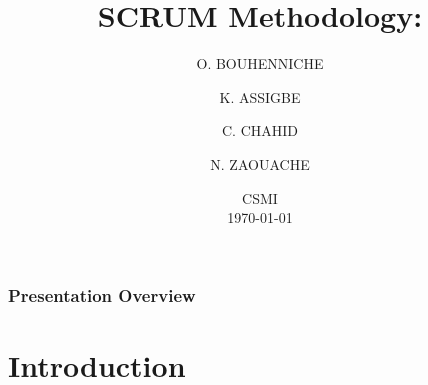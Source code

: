 \documentclass[
	11pt, %
]{beamer}
\title[Scrum Methodology]{\textbf{SCRUM Methodology:} \\ \text{Team\_SCRUM}} %
\author[BOUHENNICHE \and ASSIGBE  \and RAHOUTI \and ZAOUACHE ]{O. BOUHENNICHE \and K. ASSIGBE \and C. CHAHID \and N. ZAOUACHE} %
\institute[]{University of Strasbourg } %
\date[\today]{ CSMI \\ \today} %
\begin{document}

\begin{frame}
	\titlepage %
\end{frame}



\begin{frame}
	\frametitle{Presentation Overview} %

	\tableofcontents %
\end{frame}


\section{Introduction} %
\end{document}

